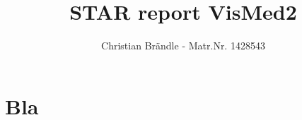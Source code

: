 \documentclass[]{article}
\title{STAR report VisMed2}
\author{Christian Brändle - Matr.Nr. 1428543}
\begin{document}
\maketitle

%


\section{Bla}
\end{document}
